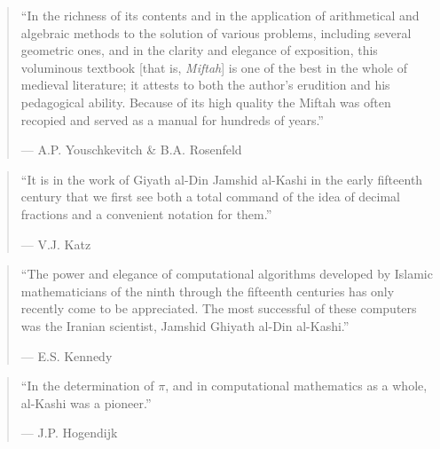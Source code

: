 \documentclass[11pt,a4paper]{book}
\begin{document}
\vspace{0.3cm}

\begin{quote}
``In the richness of its contents and in the application of arithmetical and algebraic methods to the solution of various problems, including several geometric ones, and in the clarity and elegance of exposition, this voluminous textbook [that is, \textit{Miftah}] is one of the best in the whole of medieval literature; it attests to both the author's erudition and his pedagogical ability. Because of its high quality the Miftah was often recopied and served as a manual for hundreds of years.''
\begin{flushright}
--- A.P. Youschkevitch \& B.A. Rosenfeld
\end{flushright}
\end{quote}

\vspace{0.3cm}

\begin{quote}
``It is in the work of Giyath al-Din Jamshid al-Kashi in the early fifteenth century that we first see both a total command of the idea of decimal fractions and a convenient notation for them.''
\begin{flushright}
--- V.J. Katz
\end{flushright}
\end{quote}

\vspace{0.3cm}

\begin{quote}
``The power and elegance of computational algorithms developed by Islamic mathematicians of the ninth through the fifteenth centuries has only recently come to be appreciated. The most successful of these computers was the Iranian scientist, Jamshid Ghiyath al-Din al-Kashi.''
\begin{flushright}
--- E.S. Kennedy
\end{flushright}
\end{quote}

\vspace{0.3cm}

\begin{quote}
``In the determination of $\pi$, and in computational mathematics as a whole, al-Kashi was a pioneer.''
\begin{flushright}
--- J.P. Hogendijk
\end{flushright}
\end{quote}
\end{document}
